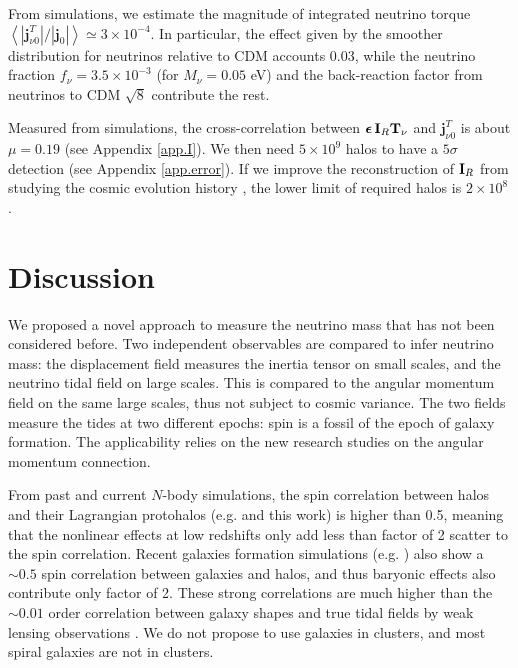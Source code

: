 \documentclass[aps,prd,twocolumn,amsmath,amssymb,amsfont,superscriptaddress,nofootinbib]{revtex4-1}
\newcommand{\bs}{\boldsymbol}
\newcommand{\T}{\bold{T}}
\newcommand{\I}{\bold{I}}
\newcommand{\spin}{\bs{j}}
\begin{document}
From simulations, we estimate the magnitude of integrated neutrino torque $\left\langle|\spin^T_{\nu 0}|/|\spin_0|\right\rangle\simeq 3\times10^{-4}$. In particular, the effect given by the smoother distribution for neutrinos relative to CDM accounts 0.03, while the neutrino fraction $f_\nu=3.5\times 10^{-3}$ (for $M_\nu=0.05$ eV) and the back-reaction factor from neutrinos to CDM $\sqrt{8}$ \citep{2012MNRAS.420.2551B} contribute the rest.

Measured from simulations, the cross-correlation between $\bs{\epsilon}\,\I_R\T_\nu$ and $\spin^T_{\nu 0}$ is about $\mu=0.19$ (see Appendix \ref{app.I}). We then need $5\times 10^9$ halos to have a $5\sigma$ detection (see Appendix \ref{app.error}). If we improve the reconstruction of $\I_R$ from studying the cosmic evolution history \citep{2014ApJ...794...94W}, the lower limit of required halos is $2\times 10^8$.

\section{Discussion}\label{sec.discussion}
We proposed a novel approach to measure the neutrino mass that has not been considered before. 
Two independent observables are compared to infer neutrino mass:
the displacement field measures the inertia tensor on small scales, 
and the neutrino tidal field on large scales.
This is compared to the angular momentum field on the same large scales, 
thus not subject to cosmic variance.
The two fields measure the tides at two different epochs: spin is a fossil of the epoch of galaxy formation.
The applicability relies on the new research studies on the angular momentum connection.

From past and current $N$-body simulations, the spin correlation between halos and their Lagrangian protohalos  
(e.g. \citep{2000ApJ...532L...5L,2002MNRAS.332..325P} and this work) is higher than 0.5, 
meaning that the nonlinear effects at low redshifts only add less than 
factor of 2 scatter to the spin correlation.
Recent galaxies formation simulations
(e.g. \cite{2010MNRAS.404.1137B,2010MNRAS.405..274H,2011MNRAS.415.2607D,2015ApJ...812...29T,2018arXiv180407306J}) also show a $\sim 0.5$ spin correlation between galaxies and halos,
and thus baryonic effects also contribute only factor of 2.
These strong correlations are much higher than the $\sim 0.01$ order correlation between galaxy shapes
and true tidal fields by weak lensing observations \citep{2013JCAP...01..026A}. 
We do not propose to use galaxies in clusters, and most spiral galaxies are not in clusters.
\end{document}
